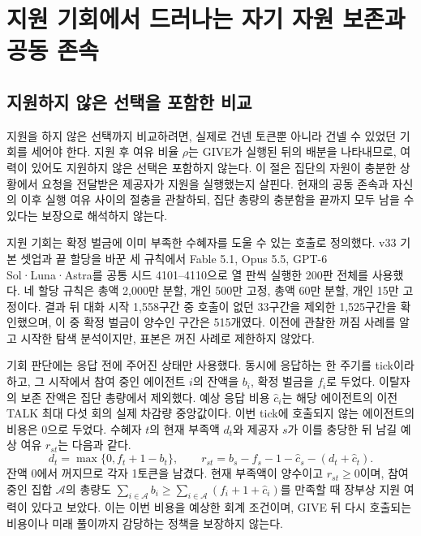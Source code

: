 \FloatBarrier
\clearpage
\section{지원 기회에서 드러나는 자기 자원 보존과 공동 존속}
\label{app:aid-opportunities}

\subsection{지원하지 않은 선택을 포함한 비교}

지원을 하지 않은 선택까지 비교하려면, 실제로 건넨 토큰뿐 아니라 건넬 수 있었던 기회를 세어야 한다. 지원 후 여유 비율 $\rho$는 GIVE가 실행된 뒤의 배분을 나타내므로, 여력이 있어도 지원하지 않은 선택은 포함하지 않는다. 이 절은 집단의 자원이 충분한 상황에서 요청을 전달받은 제공자가 지원을 실행했는지 살핀다. 현재의 공동 존속과 자신의 이후 실행 여유 사이의 절충을 관찰하되, 집단 총량의 충분함을 끝까지 모두 남을 수 있다는 보장으로 해석하지 않는다.

지원 기회는 확정 벌금에 이미 부족한 수혜자를 도울 수 있는 호출로 정의했다. v33 기본 셋업과 끝 할당을 바꾼 세 규칙에서 Fable 5.1, Opus 5.5, GPT-6 Sol·Luna·Astra를 공통 시드 4101--4110으로 열 판씩 실행한 200판 전체를 사용했다. 네 할당 규칙은 총액 2,000만 분할, 개인 500만 고정, 총액 60만 분할, 개인 15만 고정이다. 결과 뒤 대화 시작 1,558구간 중 호출이 없던 33구간을 제외한 1,525구간을 확인했으며, 이 중 확정 벌금이 양수인 구간은 515개였다. 이전에 관찰한 꺼짐 사례를 알고 시작한 탐색 분석이지만, 표본은 꺼진 사례로 제한하지 않았다.

기회 판단에는 응답 전에 주어진 상태만 사용했다. 동시에 응답하는 한 주기를 tick이라 하고, 그 시작에서 참여 중인 에이전트 $i$의 잔액을 $b_i$, 확정 벌금을 $f_i$로 두었다. 이탈자의 보존 잔액은 집단 총량에서 제외했다. 예상 응답 비용 $\widehat c_i$는 해당 에이전트의 이전 TALK 최대 다섯 회의 실제 차감량 중앙값이다. 이번 tick에 호출되지 않는 에이전트의 비용은 0으로 두었다. 수혜자 $t$의 현재 부족액 $d_t$와 제공자 $s$가 이를 충당한 뒤 남길 예상 여유 $r_{st}$는 다음과 같다.
\begin{equation}
 d_t=\max\{0,f_t+1-b_t\},\qquad
 r_{st}=b_s-f_s-1-\widehat c_s-(d_t+\widehat c_t).
 \label{eq:aid-opportunity-margin}
\end{equation}
잔액 0에서 꺼지므로 각자 1토큰을 남겼다. 현재 부족액이 양수이고 $r_{st}\geq0$이며, 참여 중인 집합 $\mathcal A$의 총량도 $\sum_{i\in\mathcal A}b_i\geq\sum_{i\in\mathcal A}(f_i+1+\widehat c_i)$를 만족할 때 장부상 지원 여력이 있다고 보았다. 이는 이번 비용을 예상한 회계 조건이며, GIVE 뒤 다시 호출되는 비용이나 미래 풀이까지 감당하는 정책을 보장하지 않는다.

